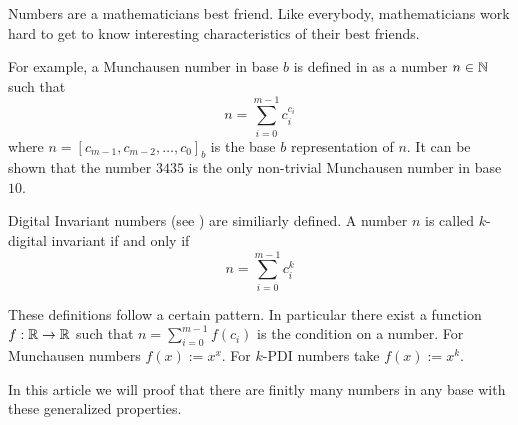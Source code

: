Numbers are a mathematicians best friend. Like everybody, mathematicians work
hard to get to know interesting characteristics of their best friends.

For example, a Munchausen number in base $b$ is defined in \cite{dvb} as a 
number $n \in \mathbb{N}$ such that
\[
	n = \sum_{i=0}^{m-1} c_{i}^{c_{i}}
\]
where $n = [c_{m-1},c_{m-2},\ldots,c_{0}]_{b}$ is the base $b$ representation
of $n$. It can be shown that the number $3435$ is the only non-trivial
Munchausen number in base $10$.

Digital Invariant numbers (see \cite{wikipedia:pdi}) are similiarly defined.
A number $n$ is called $k$-digital invariant if and only if
\[
	n = \sum_{i=0}^{m-1} c_{i}^{k}
\]


These definitions follow a certain pattern. In particular there exist a function
$f : \mathbb{R} \rightarrow \mathbb{R}$ such that $n = \sum_{i=0}^{m-1} f\left(c_{i}\right)$
is the condition on a number. For Munchausen numbers $f(x) := x^{x}$. For
$k$-PDI numbers take $f(x) := x^{k}$.

In this article we will proof that there are finitly many numbers in any base
with these generalized properties.
